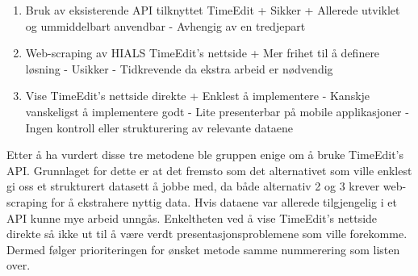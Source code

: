 \documentclass[../main.tex]{subfiles}
\begin{document}
\begin{enumerate}
\item Bruk av eksisterende API tilknyttet TimeEdit\newline
+ Sikker\newline
+ Allerede utviklet og ummiddelbart anvendbar\newline
-  Avhengig av en tredjepart\newline
\item Web-scraping av HIALS TimeEdit’s nettside\newline
+ Mer frihet til å definere løsning\newline
-  Usikker\newline
-  Tidkrevende da ekstra arbeid er nødvendig\newline
\item Vise TimeEdit’s nettside direkte\newline
+ Enklest å implementere\newline
-  Kanskje vanskeligst å implementere godt\newline
-  Lite presenterbar på mobile applikasjoner\newline
-  Ingen kontroll eller strukturering av relevante dataene\newline
\end{enumerate}

Etter å ha vurdert disse tre metodene ble gruppen enige om å bruke TimeEdit’s API. Grunnlaget for dette er at det fremsto som det alternativet som ville enklest gi oss et strukturert datasett å jobbe med, da både alternativ 2 og 3 krever web-scraping for å ekstrahere nyttig data. Hvis dataene var allerede tilgjengelig i et API kunne mye arbeid unngås. Enkeltheten ved å vise TimeEdit’s nettside direkte så ikke ut til å være verdt presentasjonsproblemene som ville forekomme. Dermed følger prioriteringen for ønsket metode samme nummerering som listen over.
\end{document}
